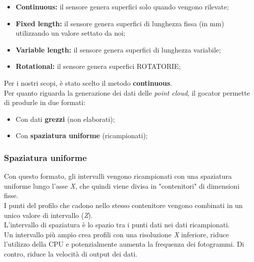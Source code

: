 \begin{itemize}
	\item \textbf{Continuous:} il sensore genera superfici solo quando vengono rilevate;
	\item \textbf{Fixed length:} il sensore genera superfici di lunghezza fissa (in mm) utilizzando un valore settato da noi;
	\item \textbf{Variable length:} il sensore genera superfici di lunghezza variabile;
	\item \textbf{Rotational:} il sensore genera superfici ROTATORIE;
\end{itemize}

\noindent Per i nostri scopi, è stato scelto il metodo \textbf{continuous}.\\
\newline
Per quanto riguarda la generazione dei dati delle \textit{point cloud}, il gocator permette di produrle in due formati:

\begin{itemize}
	\item Con dati \textbf{grezzi} (non elaborati);
	\item Con \textbf{spaziatura uniforme} (ricampionati);
\end{itemize}

\subsubsection{Spaziatura uniforme}
Con questo formato, gli intervalli vengono ricampionati con una spaziatura uniforme lungo l'asse \textit{X}, che quindi viene divisa in "contenitori" di dimensioni fisse.\\
\newline
I punti del profilo che cadono nello stesso contenitore vengono combinati in un unico valore di intervallo (\textit{Z}).\\
\newline
L'intervallo di spaziatura è lo spazio tra i punti dati nei dati ricampionati.\\
\newline
Un intervallo più ampio crea profili con una risoluzione \textit{X} inferiore, riduce l'utilizzo della CPU e potenzialmente aumenta la frequenza dei fotogrammi. Di contro, riduce la velocità di output dei dati.\\

